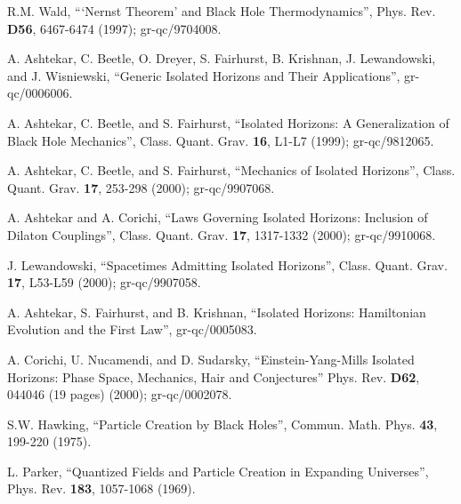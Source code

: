 \documentclass[12pt]{article}
\newcommand{\comment}[1]{}
\newcommand{\keywords}[1]{}
\begin{document}
\begin{thebibliography}{999}
\comment{article} R.M. Wald, ```Nernst Theorem' and Black
Hole Thermodynamics'', Phys. Rev. {\bf D56}, 6467-6474 (1997);
gr-qc/9704008.  \keywords{black hole thermodynamics, thermodynamics,
statistical mechanics}

\comment{online} A. Ashtekar, C. Beetle, O. Dreyer,
S. Fairhurst, B. Krishnan, J. Lewandowski, and J. Wisniewski,
``Generic Isolated Horizons and Their Applications'', gr-qc/0006006.
\keywords{black hole thermodynamics, event horizons, Hamiltonian
systems}

\comment{article} A. Ashtekar, C. Beetle, and
S. Fairhurst, ``Isolated Horizons: A Generalization of Black Hole
Mechanics'', Class. Quant. Grav. {\bf 16}, L1-L7 (1999);
gr-qc/9812065.  \keywords{black hole thermodynamics, event horizons,
Hamiltonian systems}

\comment{article} A. Ashtekar, C. Beetle, and
S. Fairhurst, ``Mechanics of Isolated Horizons'',
Class. Quant. Grav. {\bf 17}, 253-298 (2000); gr-qc/9907068.
\keywords{black hole thermodynamics, event horizons, Hamiltonian
systems}

\comment{article} A. Ashtekar and A. Corichi, ``Laws
Governing Isolated Horizons: Inclusion of Dilaton Couplings'',
Class. Quant. Grav. {\bf 17}, 1317-1332 (2000); gr-qc/9910068.
\keywords{black hole thermodynamics, event horizons, Hamiltonian
systems}

\comment{article} J. Lewandowski, ``Spacetimes Admitting
Isolated Horizons'', Class. Quant. Grav. {\bf 17}, L53-L59 (2000);
gr-qc/9907058.  \keywords{event horizons, initial value problem}

\comment{online} A. Ashtekar, S. Fairhurst, and
B. Krishnan, ``Isolated Horizons: Hamiltonian Evolution and the First
Law'', gr-qc/0005083.  \keywords{black hole thermodynamics, event
horizons, Hamiltonian systems}

\comment{article} A. Corichi, U. Nucamendi, and
D. Sudarsky, ``Einstein-Yang-Mills Isolated Horizons: Phase Space,
Mechanics, Hair and Conjectures'' Phys. Rev. {\bf D62}, 044046 (19
pages) (2000); gr-qc/0002078.  \keywords{black hole thermodynamics,
event horizons, Hamiltonian systems}

\comment{article} S.W. Hawking, ``Particle Creation by
Black Holes'', Commun. Math. Phys. {\bf 43}, 199-220 (1975).
\keywords{black hole thermodynamics, black holes, quantum field theory
in curved spacetime}

 L. Parker, ``Quantized Fields and Particle Creation in
Expanding Universes'', Phys. Rev. {\bf 183}, 1057-1068 (1969).
\keywords{quantum field theory in curved spacetime}


\end{thebibliography}
\end{document}
